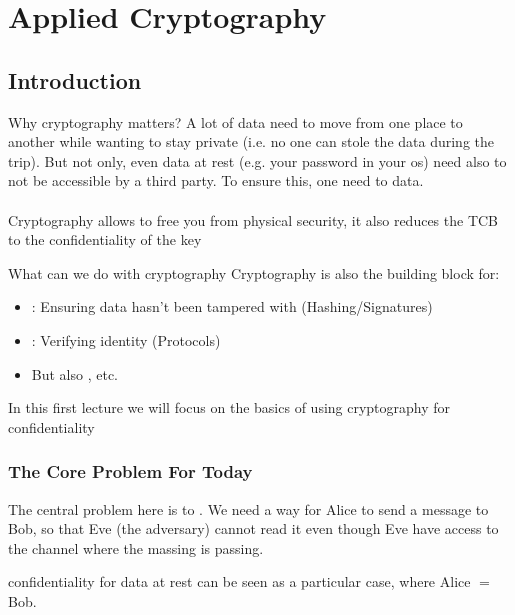 \chapter{Applied Cryptography}%
\label{cha:Applied Cryptography}

\section{Introduction}
\begin{parag}{Why cryptography matters?}
    A lot of data need to move from one place to another while wanting to stay private (i.e. no one can stole the data during the trip). But not only, even data at rest (e.g. your password in your os) need also to not be accessible by a third party. To ensure this, one need to  data.\\
	$ $\\
	Cryptography allows to free you from physical security, it also reduces the TCB to the confidentiality of the key
\end{parag}
\begin{parag}{What can we do with cryptography}
    Cryptography is also the building block for:
	\begin{itemize}
	    \item {}: Ensuring data hasn't been tampered with (Hashing/Signatures)
	    \item {}: Verifying identity (Protocols)
		\item But also , etc.
	\end{itemize}
	In this first lecture we will focus on the basics of using cryptography for confidentiality
\end{parag}

\subsection{The Core Problem For Today}
The central problem here is to . We need a way for Alice to send a message to Bob, so that Eve (the adversary) cannot read it even though Eve have access to the channel where the massing is passing. 
\begin{framedremark}
confidentiality for data at rest can be seen as a particular case, where Alice $= $ Bob.
\end{framedremark}

